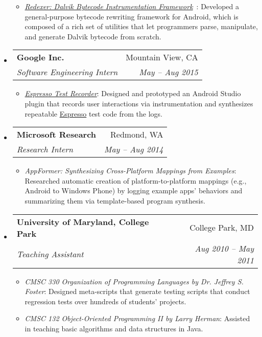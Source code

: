\documentclass[letterpaper,11pt]{article}
\makeatletter
\newcommand{\ressubheading}[4]{
\begin{tabular*}{6.5in}{l@{\extracolsep{\fill}}r}
    \textbf{#1} & #2 \\
    \textit{#3} & \textit{#4} \\
\end{tabular*}\vspace{-6pt}}
\makeatother
\begin{document}
\begin{itemize}
{\begin{itemize}
\item\emph{\href{https://github.com/plum-umd/redexer}{Redexer: Dalvik Bytecode Instrumentation Framework}}~\cite{spsm12, drandroid, acplib}:
Developed a general-purpose bytecode rewriting framework for Android,
which is composed of a rich set of utilities that let programmers
parse, manipulate, and generate Dalvik bytecode from scratch.
        \end{itemize}
        }
    \item
      \ressubheading{{Google Inc.}}{Mountain View, CA}{Software Engineering Intern}{May -- Aug 2015}
        {
\small
        \begin{itemize}
\item\emph{\href{https://developer.android.com/studio/test/espresso-test-recorder.html}{Espresso Test Recorder}}:
Designed and prototyped an Android Studio plugin that records user interactions
via instrumentation and synthesizes repeatable
\href{https://developer.android.com/training/testing/ui-testing/espresso-testing.html}{Espresso}
test code from the logs.
        \end{itemize}
        }
    \item
      \ressubheading{{Microsoft Research}}{Redmond, WA}{Research Intern}{May -- Aug 2014}
        {
\small
        \begin{itemize}
\item\emph{AppFormer: Synthesizing Cross-Platform Mappings from Examples}:
Researched automatic creation of platform-to-platform mappings
(e.g., Android to Windows Phone) by logging example apps' behaviors and
summarizing them via template-based program synthesis.
        \end{itemize}
        }
    \item
      \ressubheading{{University of Maryland, College Park}}{College Park, MD}{Teaching Assistant}{Aug 2010 -- May 2011}
        {
\small
        \begin{itemize}
\item\emph{CMSC 330 Organization of Programming Languages by Dr. Jeffrey S. Foster}:
Designed meta-scripts that generate testing scripts
that conduct regression tests over hundreds of students' projects.
\item\emph{CMSC 132 Object-Oriented Programming II by Larry Herman}:
Assisted in teaching basic algorithms and data structures in Java.
        \end{itemize}
        }


\end{itemize}
\end{document}
